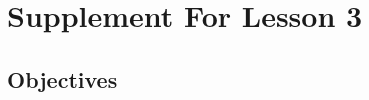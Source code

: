 \documentclass{article}
\begin{document}
\newfontfamily{}
\newfontfamily{}
\newcommand{\bul}{\hfil$\bullet$&}
\renewenvironment{glossary}{\begin{multicols}{5}\begin{center}}{\end{center}\end{multicols}}
\setcounter{secnumdepth}{0}
\setlength{\columnseprule}{1pt}

\section{Supplement For Lesson 3}

\subsection{Objectives}
\end{document}
